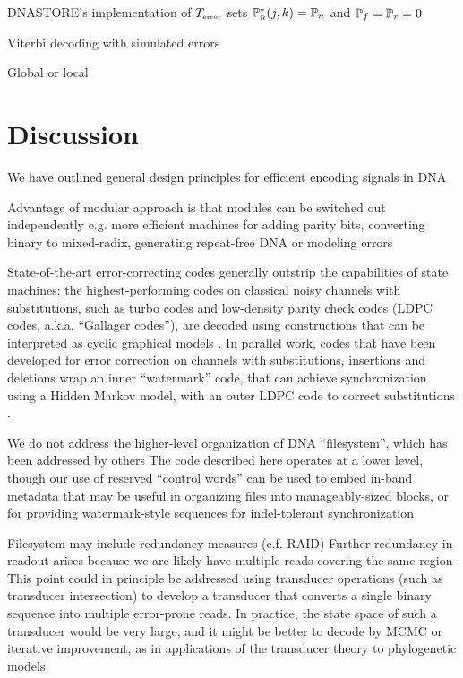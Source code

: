 \documentclass[english]{article}
\begin{document}
DNASTORE's implementation of $T_{\mbox{\tiny error}}$
sets $\mathbb{P}_{n}^\ast(j,k)=\mathbb{P}_{n}$
and $\mathbb{P}_{f}=\mathbb{P}_{r}=0$

Viterbi decoding with simulated errors

Global or local


\section{Discussion}

We have outlined general design principles for efficient encoding signals in DNA

Advantage of modular approach is that modules can be switched out independently
e.g. more efficient machines for
adding parity bits, converting binary to mixed-radix, generating repeat-free DNA
or modeling errors

State-of-the-art error-correcting codes generally outstrip the capabilities of state machines:
the highest-performing codes on classical noisy channels with substitutions, such as turbo codes and low-density parity check codes (LDPC codes, a.k.a. ``Gallager codes''),
are decoded using constructions that can be interpreted as cyclic graphical models \cite{Mackay1997,FreyMackay98}.
In parallel work, codes that have been developed for error correction on channels with substitutions, insertions and deletions
wrap an inner ``watermark'' code, that can achieve synchronization using a Hidden Markov model, with an outer LDPC code to correct substitutions
\cite{DaveyMackay2000,DaveyMackay2001}.

We do not address the higher-level organization of DNA ``filesystem'',
which has been addressed by others \cite{YazdiEtAl2015}
The code described here operates at a lower level, though our use of reserved ``control words''
can be used to embed in-band metadata that may be useful in organizing files into manageably-sized blocks,
or for providing watermark-style sequences for indel-tolerant synchronization

Filesystem may include redundancy measures (c.f. RAID)
Further redundancy in readout arises because we are likely have multiple reads covering the same region
This point could in principle be addressed using transducer operations
(such as transducer intersection) to develop a transducer that converts a single binary sequence
into multiple error-prone reads.
In practice, the state space of such a transducer would be very large, and it might be better
to decode by MCMC or iterative improvement, as in applications of the transducer theory
to phylogenetic models \cite{Holmes2003}
\end{document}
